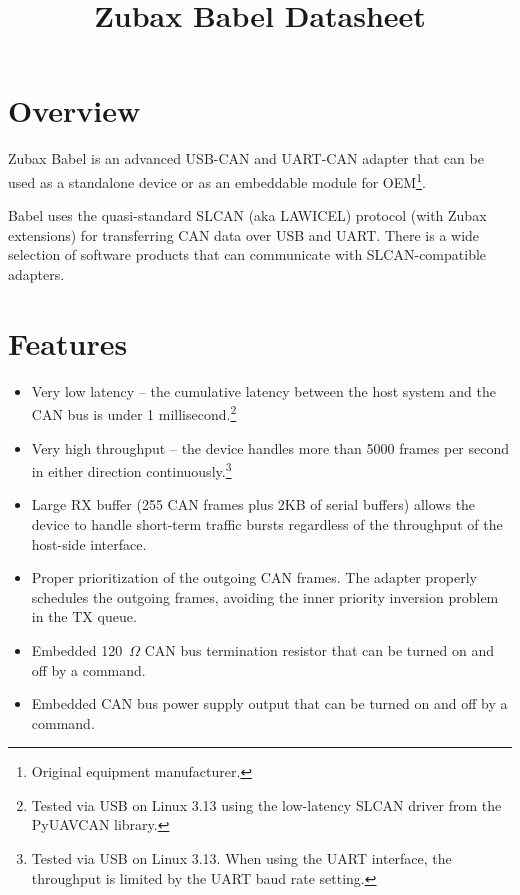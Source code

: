 \documentclass{zubaxdoc}
\title{Zubax Babel Datasheet}
\begin{document}
\frontmatter
\begin{titlepage}

\section*{Overview}

Zubax Babel is an advanced USB-\allowbreak{}CAN and UART-\allowbreak{}CAN adapter
that can be used as a standalone device or as an embeddable module for
OEM\footnote{Original equipment manufacturer.}.

Babel uses the quasi-standard SLCAN (aka LAWICEL) protocol (with Zubax extensions)
for transferring CAN data over USB and UART.
There is a wide selection of software products that can communicate with SLCAN-compatible adapters.

\section*{Features}

\begin{itemize}
    \item Very low latency -- the cumulative latency between the host system
          and the CAN bus is under 1 millisecond.\footnote{Tested via USB on Linux 3.13
          using the low-latency SLCAN driver from the PyUAVCAN library.}

    \item Very high throughput -- the device handles more than 5000 frames per second in either direction
          continuously.\footnote{Tested via USB on Linux 3.13.
          When using the UART interface, the throughput is limited by the UART baud rate setting.}

    \item Large RX buffer (255 CAN frames plus 2KB of serial buffers) allows the device to handle short-term
          traffic bursts regardless of the throughput of the host-side interface.

    \item Proper prioritization of the outgoing CAN frames.
          The adapter properly schedules the outgoing frames, avoiding the inner priority inversion problem
          in the TX queue.

    \item Embedded 120~$\Omega{}$ CAN bus termination resistor that can be turned on and off by a command.

    \item Embedded CAN bus power supply output that can be turned on and off by a command.


\end{itemize}
\end{titlepage}
\end{document}
